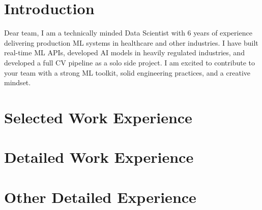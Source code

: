 \documentclass[11pt,a4paper]{moderncv}
\begin{document}
\makecvtitle

\section*{Introduction}
Dear \company{} team, I am a technically minded Data Scientist with 6 years of experience delivering production ML systems in healthcare and other industries. I have built real-time ML APIs, developed AI models in heavily regulated industries, and developed a full CV pipeline as a solo side project. I am excited to contribute to your team with a strong ML toolkit, solid engineering practices, and a creative mindset.

\section{Selected Work Experience}







\newpage
\section{Detailed Work Experience}





\section{Other Detailed Experience}

\end{document}
